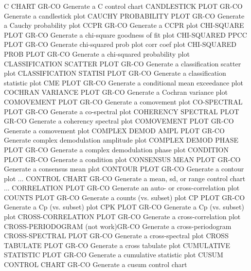 C CHART                     GR-CO Generate a C control chart
CANDLESTICK PLOT            GR-CO Generate a candlestick plot
CAUCHY PROBABILITY PLOT     GR-CO Generate a Cauchy probability plot
CCPR                        GR-CO Generate a CCPR plot 
CHI-SQUARE PLOT             GR-CO Generate a chi-square goodness of fit plot
CHI-SQUARED PPCC PLOT       GR-CO Generate chi-squared prob plot corr coef plot
CHI-SQUARED PROB PLOT       GR-CO Generate a chi-squared probability plot
CLASSIFICATION SCATTER PLOT GR-CO Generate a classification scatter plot
CLASSIFICATION STATISI PLOT GR-CO Generate a classification statistic plot
CME PLOT                    GR-CO Generate a conditional mean exceedance plot
COCHRAN VARIANCE PLOT       GR-CO Generate a Cochran variance plot
COMOVEMENT PLOT             GR-CO Generate a comovement plot
CO-SPECTRAL PLOT            GR-CO Generate a co-spectral plot
COHERENCY SPECTRAL PLOT     GR-CO Generate a coherency spectral plot
COMOVEMENT PLOT             GR-CO Generate a comovement plot
COMPLEX DEMOD AMPL PLOT     GR-CO Generate complex demodulation amplitude plot
COMPLEX DEMOD PHASE PLOT    GR-CO Generate a complex demodulation phase plot
CONDITION PLOT              GR-CO Generate a condition plot
CONSENSUS MEAN PLOT         GR-CO Generate a consensus mean plot
CONTOUR PLOT                GR-CO Generate a contour plot
... CONTROL CHART           GR-CO Generate a mean, sd, or range control chart
... CORRELATION PLOT        GR-CO Generate an auto- or cross-correlation plot
COUNTS PLOT                 GR-CO Generate a counts (vs. subset) plot
CP PLOT                     GR-CO Generate a Cp (vs. subset) plot
CPK PLOT                    GR-CO Generate a Cp (vs. subset) plot
CROSS-CORRELATION PLOT      GR-CO Generate a cross-correlation plot
CROSS-PERIODOGRAM (not work)GR-CO Generate a cross-periodogram
CROSS-SPECTRAL PLOT         GR-CO Generate a cross-spectral plot
CROSS TABULATE PLOT         GR-CO Generate a cross tabulate plot
CUMULATIVE STATISTIC PLOT   GR-CO Generate a cumulative statistic plot
CUSUM CONTROL CHART         GR-CO Generate a cusum control chart


